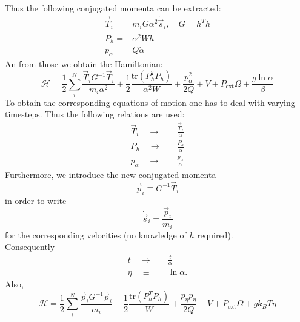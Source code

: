 \bigbreak
\bigbreak

Thus the following conjugated momenta can be extracted:
\begin{equation}
  \begin{split}
    \vec{T}_i =
    & m_i G \alpha^2 \dot{\vec{s}}_i , \quad G = h^Th \\
    P_h =
    & \alpha^2 W \dot{h} \\
    p_\alpha =
    & Q\dot{\alpha}
  \end{split}
\end{equation}
An from those we obtain the Hamiltonian:
\begin{equation}
  \mathcal{H} = \frac{1}{2}\sum_i^N \frac{\vec{T}_iG^{-1} \vec{T}_i}{m_i\alpha^2}+\frac{1}{2}\frac{\mathrm{tr}(P_h^TP_h)}{\alpha^2 W} + \frac{p_\alpha^2}{2Q}+V+P_\mathrm{ext}\Omega+\frac{g\ln{\alpha}}{\beta}
\end{equation}
To obtain the corresponding equations of motion one has to deal with varying timesteps. Thus the following relations are used:
\begin{equation}
  \begin{split}
    \vec{T}_i \quad \rightarrow \quad
    & \frac{\vec{T}_i}{\alpha} \\
    P_h \quad \rightarrow \quad
    & \frac{P_h}{\alpha} \\
    p_\alpha \quad \rightarrow \quad
    & \frac{p_\alpha}{\alpha}
  \end{split}
\end{equation}
Furthermore, we introduce the new conjugated momenta
\begin{equation}
  \vec{p}_i \equiv G^{-1}\vec{T}_i
\end{equation}
in order to write
\begin{equation}
  \dot{\vec{s}}_i = \frac{\vec{p}_i}{m_i}
\end{equation}
for the corresponding velocities (no knowledge of $h$ required).\\
Consequently
\begin{equation}
  \begin{split}
    t \quad \rightarrow \quad
    & \frac{t}{\alpha} \\
    \eta \quad \equiv \quad
    & \ln{\alpha}
    .
  \end{split}
\end{equation}
Also,
\begin{equation}
  \label{for:Hamilton}
  \mathcal{H} = \frac{1}{2}\sum_i^N \frac{\vec{p}_iG^{-1} \vec{p}_i}{m_i}+\frac{1}{2}\frac{\mathrm{tr}(P_h^TP_h)}{W} + \frac{p_\eta p_\eta}{2Q}+V+P_\mathrm{ext}\Omega + g k_B T \eta
\end{equation}
